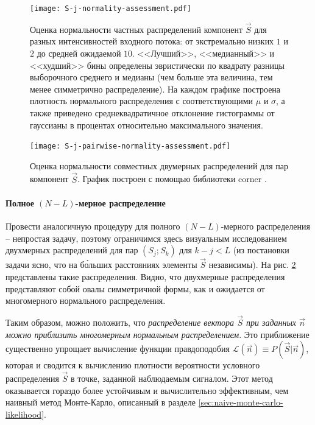 \documentclass[12pt]{book}
\begin{document}
	\begin{figure}
		\centering
		\texttt{[image: S-j-normality-assessment.pdf]}
		\caption{Оценка нормальности частных распределений компонент $\vec{S}$ для разных интенсивностей входного потока: от экстремально низких $1$ и $2$ до средней ожидаемой $10$. <<Лучший>>, <<медианный>> и <<худший>> бины определены эвристически по квадрату разницы выборочного среднего и медианы (чем больше эта величина, тем менее симметрично распределение). На каждом графике построена плотность нормального распределения с соответствующими $\mu$ и $\sigma$, а также приведено среднеквадратичное отклонение гистограммы от гауссианы в процентах относительно максимального значения.}
		\label{pic:s-j-norm-assess}
	\end{figure}

	\begin{figure}
		\centering
		\texttt{[image: S-j-pairwise-normality-assessment.pdf]}
		\caption{Оценка нормальности совместных двумерных распределений для пар компонент $\vec{S}$. График построен с помощью библиотеки corner \cite{ForemanMackey2016}.}
		\label{pic:s-j-pairwise-norm-assess}
	\end{figure}

	\paragraph{Полное $(N-L)$-мерное распределение}
	Провести аналогичную процедуру для полного $(N-L)$-мерного распределения -- непростая задачу, поэтому ограничимся здесь визуальным исследованием двухмерных распределений для пар $(S_j; S_k)$ для $k - j < L$ (из постановки задачи ясно, что на б\'{о}льших расстояниях элементы $\vec{S}$ независимы). На рис. \ref{pic:s-j-pairwise-norm-assess} представлены такие распределения. Видно, что двухмерные распределения представляют собой овалы симметричной формы, как и ожидается от многомерного нормального распределения.
	
	Таким образом, можно положить, что \textit{распределение вектора $\vec{S}$ при заданных $\vec{n}$ можно приблизить многомерным нормальным распределением}. Это приближение существенно упрощает вычисление функции правдоподобия $\mathcal{L}(\vec{n}) \equiv P(\vec{S} | \vec{n})$, которая и сводится к вычислению плотности вероятности условного распределения $\vec{S}$ в точке, заданной наблюдаемым сигналом. Этот метод оказывается гораздо более устойчивым и вычислительно эффективным, чем наивный метод Монте-Карло, описанный в разделе \ref{sec:naive-monte-carlo-likelihood}.
\end{document}
